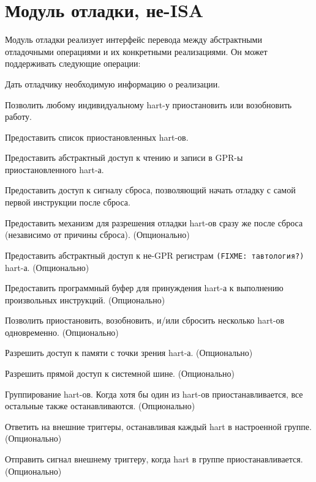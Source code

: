 \chapter{Модуль отладки, не-ISA} \label{dm}

\begin{steps}{Модуль отладки реализует интерфейс перевода между абстрактными отладочными
    операциями и их конкретными реализациями. Он может поддерживать следующие
    операции:}
\item Дать отладчику необходимую информацию о реализации.
\item Позволить любому индивидуальному hart-у приостановить или возобновить работу.
\item Предоставить список приостановленных hart-ов.
\item Предоставить абстрактный доступ к чтению и записи в GPR-ы приостановленного hart-а.
\item Предоставить доступ к сигналу сброса, позволяющий начать отладку с самой
    первой инструкции после сброса.
\item Предоставить механизм для разрешения отладки hart-ов сразу же после сброса
      (независимо от причины сброса). (Опционально)
\item Предоставить абстрактный доступ к не-GPR регистрам \texttt{(FIXME: тавтология?)} hart-а. (Опционально)
\item Предоставить программный буфер для принуждения hart-а к выполнению произвольных инструкций. (Опционально)
\item Позволить приостановить, возобновить, и/или сбросить несколько hart-ов одновременно. (Опционально)
\item Разрешить доступ к памяти с точки зрения hart-а. (Опционально)
\item Разрешить прямой доступ к системной шине. (Опционально)
\item Группирование hart-ов. Когда хотя бы один из hart-ов приостанавливается, все остальные также останавливаются. (Опционально)
\item Ответить на внешние триггеры, останавливая каждый hart в настроенной группе. (Опционально)
\item Отправить сигнал внешнему триггеру, когда hart в группе приостанавливается. (Опционально)
\end{steps}

